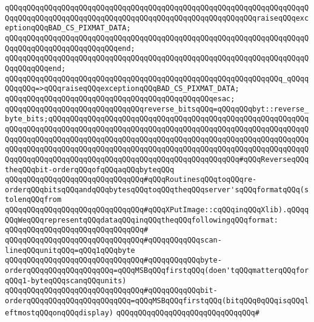 \verb|qQQqqQQqqQQqqQQqqQQqqQQqqQQqqQQqqQQqqQQqqQQqqQQqqQQqqQQqqQQqqQQqqQQqqQQqqQQqqQQqqQQqqQQqqQQqqQQqqQQqqQQqqQQqqQQqqQQqqQQqqQQqqQQqraiseqQQqexceptionqQQqBAD_CS_PIXMAT_DATA;|\newline
\verb|qQQqqQQqqQQqqQQqqQQqqQQqqQQqqQQqqQQqqQQqqQQqqQQqqQQqqQQqqQQqqQQqqQQqqQQqqQQqqQQqqQQqqQQqqQQqqQQqend;|\newline
\verb|qQQqqQQqqQQqqQQqqQQqqQQqqQQqqQQqqQQqqQQqqQQqqQQqqQQqqQQqqQQqqQQqqQQqqQQqqQQqqQQqend;|\newline
\newline
\verb|qQQqqQQqqQQqqQQqqQQqqQQqqQQqqQQqqQQqqQQqqQQqqQQqqQQqqQQqqQQqqQQq_qQQqqQQqqQQq=>qQQqraiseqQQqexceptionqQQqBAD_CS_PIXMAT_DATA;|\newline
\verb|qQQqqQQqqQQqqQQqqQQqqQQqqQQqqQQqqQQqqQQqqQQqqQQqesac;|\newline
\newline
\newline
\verb|qQQqqQQqqQQqqQQqqQQqqQQqqQQqqQQqreverse_bitsqQQq=qQQqqQQqbyt::reverse_byte_bits;qQQqqQQqqQQqqQQqqQQqqQQqqQQqqQQqqQQqqQQqqQQqqQQqqQQqqQQqqQQqqQQqqQQqqQQqqQQqqQQqqQQqqQQqqQQqqQQqqQQqqQQqqQQqqQQqqQQqqQQqqQQqqQQqqQQqqQQqqQQqqQQqqQQqqQQqqQQqqQQqqQQqqQQqqQQqqQQqqQQqqQQqqQQqqQQqqQQqqQQqqQQqqQQqqQQqqQQqqQQqqQQqqQQqqQQqqQQqqQQqqQQqqQQqqQQqqQQqqQQqqQQqqQQqqQQqqQQqqQQqqQQqqQQqqQQqqQQqqQQqqQQqqQQqqQQqqQQqqQQqqQQq#qQQqReverseqQQqtheqQQqbit-orderqQQqofqQQqaqQQqbyteqQQq|\newline
\newline
\verb|qQQqqQQqqQQqqQQqqQQqqQQqqQQqqQQq#qQQqRoutinesqQQqtoqQQqre-orderqQQqbitsqQQqandqQQqbytesqQQqtoqQQqtheqQQqserver'sqQQqformatqQQq(stolenqQQqfrom|\newline
\verb|qQQqqQQqqQQqqQQqqQQqqQQqqQQqqQQq#qQQqXPutImage::cqQQqinqQQqXlib).qQQqqQQqWeqQQqrepresentqQQqdataqQQqinqQQqtheqQQqfollowingqQQqformat:|\newline
\verb|qQQqqQQqqQQqqQQqqQQqqQQqqQQqqQQq#|\newline
\verb|qQQqqQQqqQQqqQQqqQQqqQQqqQQqqQQq#qQQqqQQqqQQqscan-lineqQQqunitqQQq=qQQq1qQQqbyte|\newline
\verb|qQQqqQQqqQQqqQQqqQQqqQQqqQQqqQQq#qQQqqQQqqQQqbyte-orderqQQqqQQqqQQqqQQqqQQq=qQQqMSBqQQqfirstqQQq(doen'tqQQqmatterqQQqforqQQq1-byteqQQqscanqQQqunits)|\newline
\verb|qQQqqQQqqQQqqQQqqQQqqQQqqQQqqQQq#qQQqqQQqqQQqbit-orderqQQqqQQqqQQqqQQqqQQqqQQq=qQQqMSBqQQqfirstqQQq(bitqQQq0qQQqisqQQqleftmostqQQqonqQQqdisplay)|\newline
\verb|qQQqqQQqqQQqqQQqqQQqqQQqqQQqqQQq#|\newline

